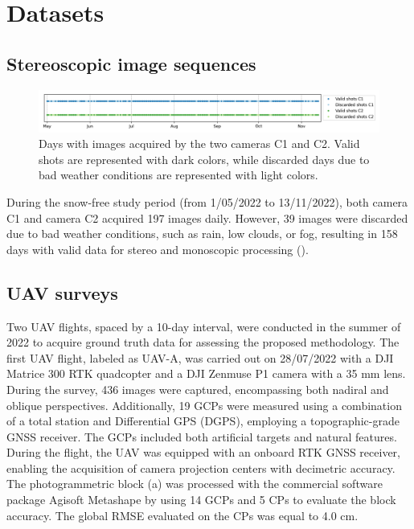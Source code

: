 \section{Datasets}\label{sec:4:datasets}

\subsection{Stereoscopic image sequences}\label{sec:4:stereo}

\begin{figure}[ht!]
  \centering
  \includegraphics[width=162mm]{4_discardes_shots.png}
  \caption{Days with images acquired by the two cameras C1 and C2. Valid shots are
    represented with dark colors, while discarded days due to bad weather conditions are
    represented with light colors.}
  \label{fig:4:discardes_shots}
\end{figure}

During the snow-free study period (from 1/05/2022 to 13/11/2022), both camera C1 and camera C2 acquired 197 images daily. 
However, 39 images were discarded due to bad weather conditions, such as rain, low clouds, or fog, resulting in 158 days with valid data for stereo and monoscopic processing ().

\subsection{UAV surveys}\label{sec:4:uavsurveys}

Two UAV flights, spaced by a 10-day interval, were conducted in the summer of 2022 to acquire ground truth data for assessing the proposed methodology.
The first UAV flight, labeled as UAV-A, was carried out on 28/07/2022 with a DJI Matrice 300 RTK quadcopter and a DJI Zenmuse P1 camera with a 35 mm lens.
During the survey, 436 images were captured, encompassing both nadiral and oblique perspectives.
Additionally, 19 GCPs were measured using a combination of a total station and Differential GPS (DGPS), employing a topographic-grade GNSS receiver.
The GCPs included both artificial targets and natural features.
During the flight, the UAV was equipped with an onboard RTK GNSS receiver, enabling the acquisition of camera projection centers with decimetric accuracy.
The photogrammetric block (a) was processed with the commercial software package Agisoft Metashape \citep{agisoft} by using 14 GCPs and 5 CPs to evaluate the block accuracy.
The global RMSE evaluated on the CPs was equal to 4.0 cm.

